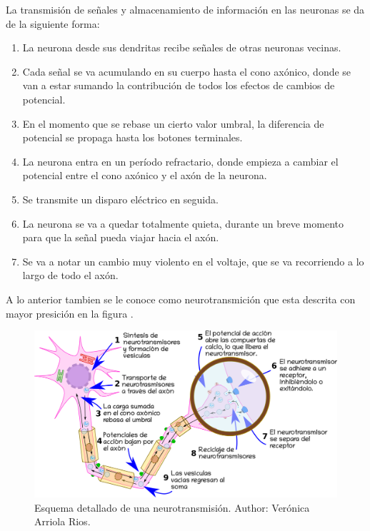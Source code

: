 La transmisión de señales y almacenamiento de información en las neuronas se da de la siguiente forma:\parencite{neurona_A_cerebro}

\begin{enumerate}
 \item La neurona desde sus dendritas recibe señales de otras neuronas vecinas.
 \item Cada señal se va acumulando en su cuerpo hasta el cono axónico, donde se van a estar sumando la contribución de todos los efectos de cambios de potencial.
 \item En el momento que se rebase un cierto valor umbral, la diferencia de potencial se propaga hasta los botones terminales.
 \item La neurona entra en un período refractario, donde empieza a cambiar el potencial entre el cono axónico y el axón de la neurona.
 \item Se transmite un disparo eléctrico en seguida.
 \item La neurona se va a quedar totalmente quieta, durante un breve momento para que la señal pueda viajar hacia el axón.
 \item Se va a notar un cambio muy violento en el voltaje, que se va recorriendo a lo largo de todo el axón. 
\end{enumerate}

A lo anterior tambien se le conoce como neurotransmición que esta  descrita con mayor presición en la figura  .

\begin{figure}[h]
 \centering
 \includegraphics[scale=0.2]{../Figuras/neurotransmision.png} 
 \caption{Esquema detallado de una neurotransmisión. Author: Verónica Arriola Rios.}
 \label{fig:nTransmision}
\end{figure}

